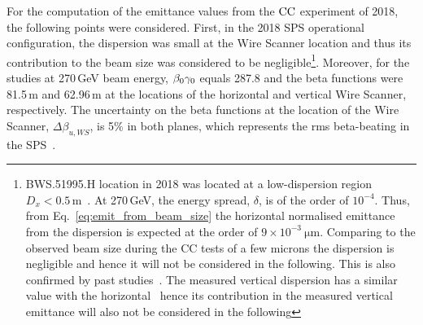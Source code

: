 For the computation of the emittance values from the ${\mathrm{CC}}$ experiment of 2018, the following points were considered. First, in the 2018 SPS operational configuration, the dispersion was small at the Wire Scanner location and thus its contribution to the beam size was considered to be negligible\footnote{BWS.51995.H location in 2018 was located at a low-dispersion region $D_x < 0.5$\,m~\cite{Roncarolo:1481835}. At 270\,GeV, the energy spread, $\delta$, is of the order of $\mathrm{10^{-4}}$. Thus, from Eq.~\eqref{eq:emit_from_beam_size} the horizontal normalised emittance from the dispersion is expected at the order of $\mathrm{9\times 10^{-3} \ \mu m}$. Comparing to the observed beam size during the CC tests of a few microns the dispersion is negligible and hence it will not be considered in the following. This is also confirmed by past studies~\cite{Roncarolo:1481835}. The measured vertical dispersion has a similar value with the horizontal~\cite{Hannes_personal_communication} hence its contribution in the measured vertical emittance will also not be considered in the following}. Moreover, for the studies at 270\,GeV beam energy, ${\beta_0} {\gamma_0}$ equals 287.8 and the beta functions were 81.5\,m and 62.96\,m at the locations of the horizontal and vertical Wire Scanner, respectively. The uncertainty on the beta functions at the location of the Wire Scanner, $\Delta \beta_{u, WS}$, is 5$\%$ in both planes, which represents the rms beta-beating in the SPS~\cite{SPS-beta-beating-Rogelio}.




